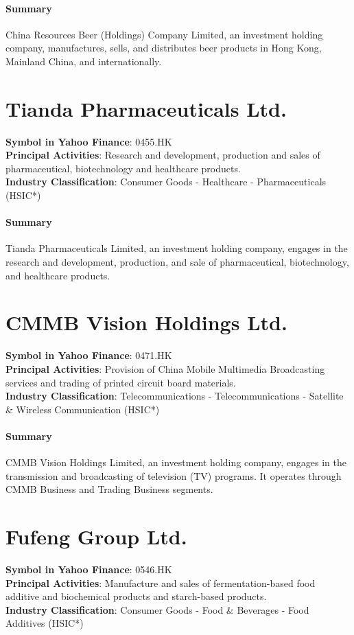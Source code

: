 \paragraph{Summary}
China Resources Beer (Holdings) Company Limited, an investment holding company, manufactures, sells, and distributes beer products in Hong Kong, Mainland China, and internationally.


\section{Tianda Pharmaceuticals Ltd.}
\textbf{Symbol in Yahoo Finance}: 0455.HK\\
\textbf{Principal Activities}: Research and development, production and sales of pharmaceutical, biotechnology and healthcare products.\\
\textbf{Industry Classification}: Consumer Goods - Healthcare - Pharmaceuticals (HSIC*)
\paragraph{Summary}
Tianda Pharmaceuticals Limited, an investment holding company, engages in the research and development, production, and sale of pharmaceutical, biotechnology, and healthcare products.


\section{CMMB Vision Holdings Ltd.}
\textbf{Symbol in Yahoo Finance}: 0471.HK\\
\textbf{Principal Activities}: Provision of China Mobile Multimedia Broadcasting services and trading of printed circuit board materials.\\
\textbf{Industry Classification}: Telecommunications - Telecommunications - Satellite \& Wireless Communication (HSIC*)
\paragraph{Summary}
CMMB Vision Holdings Limited, an investment holding company, engages in the transmission and broadcasting of television (TV) programs. It operates through CMMB Business and Trading Business segments.


\section{Fufeng Group Ltd.}
\textbf{Symbol in Yahoo Finance}: 0546.HK\\
\textbf{Principal Activities}: Manufacture and sales of fermentation-based food additive and biochemical products and starch-based products.\\
\textbf{Industry Classification}: Consumer Goods - Food \& Beverages - Food Additives (HSIC*)
